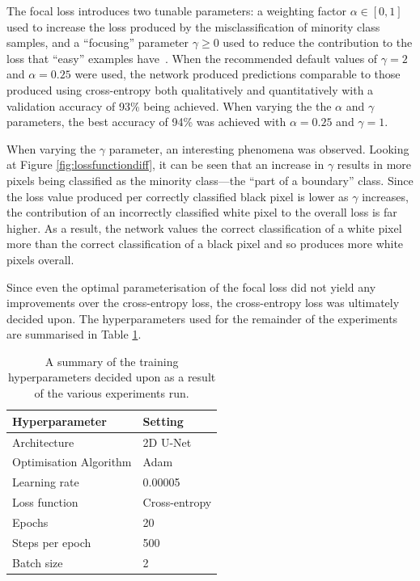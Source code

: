 The focal loss introduces two tunable parameters: a weighting factor $\alpha \in [0, 1]$ used to increase the loss produced by the misclassification of minority class samples, and a ``focusing'' parameter $\gamma \geq 0$ used to reduce the contribution to the loss that ``easy'' examples have~\cite{focalloss}. When the recommended default values of $\gamma=2$ and $\alpha=0.25$ were used, the network produced predictions comparable to those produced using cross-entropy both qualitatively and quantitatively with a validation accuracy of 93\% being achieved. When varying the the $\alpha$ and $\gamma$ parameters, the best accuracy of 94\% was achieved with $\alpha=0.25$ and $\gamma=1$.

When varying the $\gamma$ parameter, an interesting phenomena was observed. Looking at Figure \ref{fig:lossfunctiondiff}, it can be seen that an increase in $\gamma$ results in more pixels being classified as the minority class---the ``part of a boundary'' class. Since the loss value produced per correctly classified black pixel is lower as $\gamma$ increases, the contribution of an incorrectly classified white pixel to the overall loss is far higher. As a result, the network values the correct classification of a white pixel more than the correct classification of a black pixel and so produces more white pixels overall.

Since even the optimal parameterisation of the focal loss did not yield any improvements over the cross-entropy loss, the cross-entropy loss was ultimately decided upon. The hyperparameters used for the remainder of the experiments are summarised in Table \ref{tab:hyperparams1}.

\begin{table}[t]
    \centering
    \caption{A summary of the training hyperparameters decided upon as a result of the various experiments run.}
    \begin{tabular}{@{}ll@{}}
    \toprule
    Hyperparameter   & Setting      \\ \midrule
    Architecture     & 2D U-Net   \\
    Optimisation Algorithm & Adam \\
    Learning rate & 0.00005 \\
    Loss function & Cross-entropy \\
    Epochs & 20 \\
    Steps per epoch & 500 \\
    Batch size & 2 \\ \bottomrule
    \end{tabular}
    \label{tab:hyperparams1}
\end{table}

